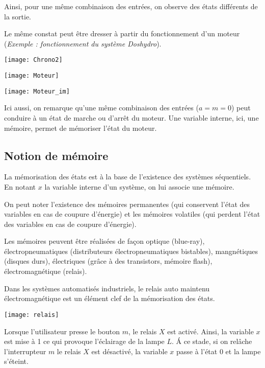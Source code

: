 Ainsi, pour une même combinaison des entrées, on observe des états différents de la sortie.

Le même constat peut être dresser à partir du fonctionnement d'un moteur (\textit{Exemple : fonctionnement du système Doshydro}).


\begin{minipage}[c]{.47\linewidth}
\begin{center}
\texttt{[image: Chrono2]}
\end{center}
\end{minipage} \hfill
\begin{minipage}[c]{.47\linewidth}
\begin{center}
\texttt{[image: Moteur]}

\texttt{[image: Moteur\_im]}
\end{center}
\end{minipage}

Ici aussi, on remarque qu'une même combinaison des entrées ($a=m=0$) peut conduire à un état de marche ou d'arrêt du moteur. Une variable interne, ici, une mémoire, permet de mémoriser l'état du moteur. 

\subsection{Notion de mémoire}

La mémorisation des états est à la base de l'existence des systèmes séquentiels. En notant $x$ la variable interne d'un système, on lui associe une mémoire.

 On peut noter l'existence des mémoires permanentes (qui conservent l'état des variables en cas de coupure d'énergie) et les mémoires volatiles (qui perdent l'état des variables en cas de coupure d'énergie).  
 
 Les mémoires peuvent être réalisées de façon optique (blue-ray), électropneumatiques (distributeurs électropneumatiques bistables), mangnétiques (disques durs), électriques (grâce à des transistors, mémoire flash), électromagnétique (relais). 
 
 Dans les systèmes automatisés industriels, le relais auto maintenu électromagnétique est un élément clef de la mémorisation des états. 

\begin{center}
\texttt{[image: relais]}
\end{center}

Lorsque l'utilisateur presse le bouton $m$, le relais $X$ est activé. Ainsi, la variable $x$ est mise à 1 ce qui provoque l'éclairage de la lampe $L$. \'A ce stade, si on relâche l'interrupteur $m$ le relais $X$ est désactivé, la variable $x$ passe à l'état 0 et la lampe s'éteint.

